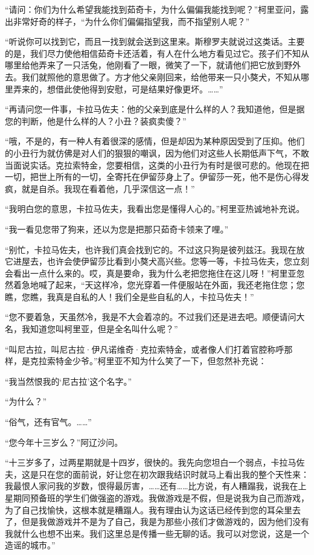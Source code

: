 \par “请问：你们为什么希望我能找到茹奇卡，为什么偏偏我能找到呢？”柯里亚问，露出非常好奇的样子，“为什么你们偏偏指望我，而不指望别人呢？”
\par “听说你可以找到它，而且一找到就会送到这里来。斯穆罗夫就说过这类话。主要的是，我们尽力使他相信茹奇卡还活着，有人在什么地方看见过它。孩子们不知从哪里给他弄来了一只活兔，他刚看了一眼，微笑了一下，就请他们把它放到野外去。我们就照他的意思做了。方才他父亲刚回来，给他带来一只小獒犬，不知从哪里弄来的，想借此使他得到安慰，可是结果好像更坏。……”
\par “再请问您一件事，卡拉马佐夫：他的父亲到底是什么样的人？我知道他，但是据您的判断，他是什么样的人？小丑？装疯卖傻？”
\par “哦，不是的，有一种人有着很深的感情，但是却因为某种原因受到了压抑。他们的小丑行为就仿佛是对人们的狠狠的嘲讽，因为他们对这些人长期低声下气，不敢当面说实话。克拉索特金，您要相信，这类的小丑行为有时是很可悲的。他现在把一切，把世上所有的一切，全寄托在伊留莎身上了。伊留莎一死，他不是伤心得发疯，就是自杀。我现在看着他，几乎深信这一点！”
\par “我明白您的意思，卡拉马佐夫，我看出您是懂得人心的。”柯里亚热诚地补充说。
\par “我一看见您带了狗来，还以为您是把那只茹奇卡领来了哩。”
\par “别忙，卡拉马佐夫，也许我们真会找到它的。不过这只狗是彼列兹汪。我现在放它进屋去，也许会使伊留莎比看到小獒犬高兴些。您等一等，卡拉马佐夫，您立刻会看出一点什么来的。哎，真是要命，我为什么老把您拖住在这儿呀！”柯里亚忽然着急地喊了起来，“天这样冷，您光穿着一件便服站在外面，我还老拖住您；您瞧，您瞧，我真是自私的人！我们全是些自私的人，卡拉马佐夫！”
\par “您不要着急，天虽然冷，我是不大会着凉的。不过我们还是进去吧。顺便请问大名，我知道您叫柯里亚，但是全名叫什么呢？”
\par “叫尼古拉，叫尼古拉·伊凡诺维奇·克拉索特金，或者像人们打着官腔称呼那样，是克拉索特金少爷。”柯里亚不知为什么笑了一下，但忽然补充说：
\par “我当然恨我的‘尼古拉’这个名字。”
\par “为什么？”
\par “俗气，还有官气。……”
\par “您今年十三岁么？”阿辽沙问。
\par “十三岁多了，过两星期就是十四岁，很快的。我先向您坦白一个弱点，卡拉马佐夫，这是只在您的面前说，好让您在初次跟我结识时就马上看出我的整个天性来：我最恨人家问我的岁数，恨得最厉害，……还有……比方说，有人糟蹋我，说我在上星期同预备班的学生们做强盗的游戏。我做游戏是不假，但是说我为自己而游戏，为了自己找愉快，这根本就是糟蹋人。我有理由认为这话已经传到您的耳朵里去了，但是我做游戏并不是为了自己，我是为那些小孩们才做游戏的，因为他们没有我就什么也想不出来。我们这里总是传播一些无聊的话。我可以对您说，这是一个造谣的城市。”
